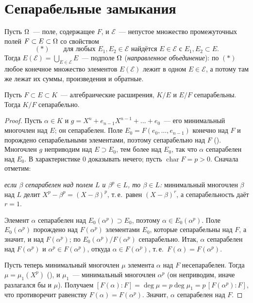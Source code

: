 \section{Сепарабельные замыкания}

Пусть $\Omega$~--- поле, содержащее $F$, и $\mathcal E$~--- непустое множество промежуточных полей $F\subset E\subset\Omega$ со
свойством
\[
(*)\qquad\text{для любых }E_1,E_2\in\mathcal E\text{ найдётся }E\in\mathcal E\text{ с }E_1,E_2\subset E.
\]
Тогда $E(\mathcal E)=\bigcup_{E\in\mathcal E}E$~--- подполе $\Omega$ (\emph{направленное объединение}): по $(*)$ любое
конечное множество элементов $E(\mathcal E)$ лежит в одном $E\in\mathcal E$, а потому там же лежат их суммы,
произведения и обратные.

\begin{lemma}
Пусть $F\subset E\subset K$~--- алгебраические расширения, $K/E$ и $E/F$ сепарабельны. Тогда $K/F$ сепарабельно.
\end{lemma}

\begin{proof}
Пусть $\alpha\in K$ и $g=X^n+e_{n-1}X^{n-1}+\dots+e_0$~--- его минимальный многочлен над $E$; он сепарабелен. Поле
$E_0=F(e_0,\dots,e_{n-1})$ конечно над $F$ и порождено сепарабельными элементами, поэтому сепарабельно над $F$ ().
Многочлен $g$ неприводим над $E\supset E_0$, тем более над $E_0$, так что $\alpha$ сепарабелен над $E_0$. В
характеристике $0$ доказывать нечего; пусть $\operatorname{char}F=p>0$. Сначала отметим:

\emph{если $\beta$ сепарабелен над полем $L$ и $\beta^p\in L$, то $\beta\in L$:} минимальный многочлен $\beta$ над $L$
делит $X^p-\beta^p=(X-\beta)^p$, т.\,е.\ равен $(X-\beta)^r$, а сепарабельность даёт $r=1$.

Элемент $\alpha$ сепарабелен над $E_0(\alpha^p)\supset E_0$, поэтому $\alpha\in E_0(\alpha^p)$. Поле
$E_0(\alpha^p)$ порождено над $F(\alpha^p)$ элементами $E_0$, которые сепарабельны над $F$, а значит, и над
$F(\alpha^p)$; по  $E_0(\alpha^p)/F(\alpha^p)$ сепарабельно. Итак, $\alpha$ сепарабелен над $F(\alpha^p)$ и
$\alpha^p\in F(\alpha^p)$, откуда $\alpha\in F(\alpha^p)$, т.\,е.\ $F(\alpha)=F(\alpha^p)$.

Пусть теперь минимальный многочлен $\mu$ элемента $\alpha$ над $F$ несепарабелен. Тогда $\mu=\mu_1(X^p)$ (),
и $\mu_1$~--- минимальный многочлен $\alpha^p$ (он неприводим, иначе разлагался бы и $\mu$). Получаем
$[F(\alpha):F]=\deg\mu=p\deg\mu_1=p\,[F(\alpha^p):F]$, что противоречит равенству $F(\alpha)=F(\alpha^p)$. Значит,
$\alpha$ сепарабелен над $F$.
\end{proof}

